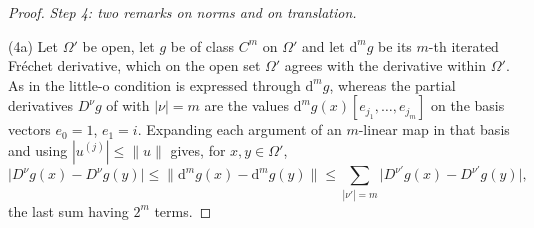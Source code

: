 \begin{proof}
\emph{Step 4: two remarks on norms and on translation.}

\noindent(4a) Let $\Omega'$ be open, let $g$ be of class $C^m$ on $\Omega'$ and
let $\mathrm{d}^mg$ be its $m$-th iterated Fréchet derivative, which on the
open set $\Omega'$ agrees with the derivative within $\Omega'$.  As in
 the little-o condition is expressed through
$\mathrm{d}^mg$, whereas the partial derivatives $D^\nu g$ of
 with $|\nu|=m$ are the values
$\mathrm{d}^mg(x)[e_{j_1},\dots,e_{j_m}]$ on the basis vectors $e_0=1$,
$e_1=i$.  Expanding each argument of an $m$-linear map in that basis and
using $|u^{(j)}|\le\|u\|$ gives, for $x,y\in\Omega'$,
\begin{equation}\tag{3}
  \bigl|D^\nu g(x)-D^\nu g(y)\bigr|
    \le\bigl\|\mathrm{d}^mg(x)-\mathrm{d}^mg(y)\bigr\|
    \le\sum_{|\nu'|=m}\bigl|D^{\nu'}g(x)-D^{\nu'}g(y)\bigr| ,
\end{equation}
the last sum having $2^m$ terms.


\end{proof}
